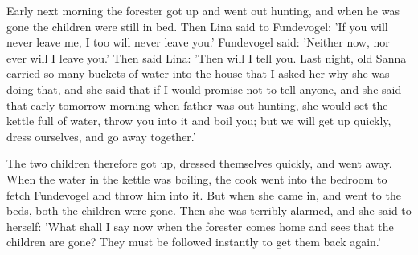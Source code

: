 \documentclass[12pt]{book}
\begin{document}
Early next morning the forester got up and went out hunting, and when
he was gone the children were still in bed. Then Lina said to
Fundevogel: 'If you will never leave me, I too will never leave you.'
Fundevogel said: 'Neither now, nor ever will I leave you.' Then said
Lina: 'Then will I tell you. Last night, old Sanna carried so many
buckets of water into the house that I asked her why she was doing
that, and she said that if I would promise not to tell anyone, and she
said that early tomorrow morning when father was out hunting, she
would set the kettle full of water, throw you into it and boil you;
but we will get up quickly, dress ourselves, and go away together.'

The two children therefore got up, dressed themselves quickly, and
went away. When the water in the kettle was boiling, the cook went
into the bedroom to fetch Fundevogel and throw him into it. But when
she came in, and went to the beds, both the children were gone. Then
she was terribly alarmed, and she said to herself: 'What shall I say
now when the forester comes home and sees that the children are gone?
They must be followed instantly to get them back again.'
\end{document}
